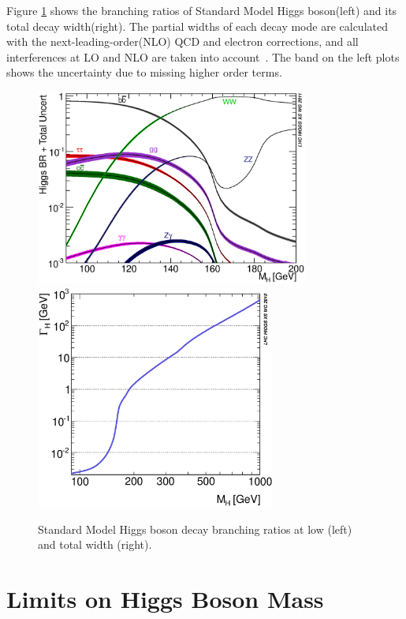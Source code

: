 Figure \ref{fig:YRHXS2_BR_Fig1} shows the branching ratios of Standard 
Model Higgs boson(left) and its total decay width(right). The partial widths of each 
decay mode are calculated with the next-leading-order(NLO) QCD 
and electron corrections, and all interferences at LO and NLO are 
taken into account~\cite{Dittmaier:1318996}. The band on the left plots 
shows the uncertainty due to missing higher order terms. 
%
\begin{figure}[htp]
\centering
\includegraphics[width=0.8\textwidth]{figures/YRHXS2_BR_Fig1.eps}  \\
\includegraphics[width=0.7\textwidth]{figures/YRHXS_BR_fig2}
\caption{Standard Model Higgs boson decay branching ratios at low \mHi(left) 
and total width (right).}
\label{fig:YRHXS2_BR_Fig1}
\end{figure}


\newpage
\section{Limits on Higgs Boson Mass} 

